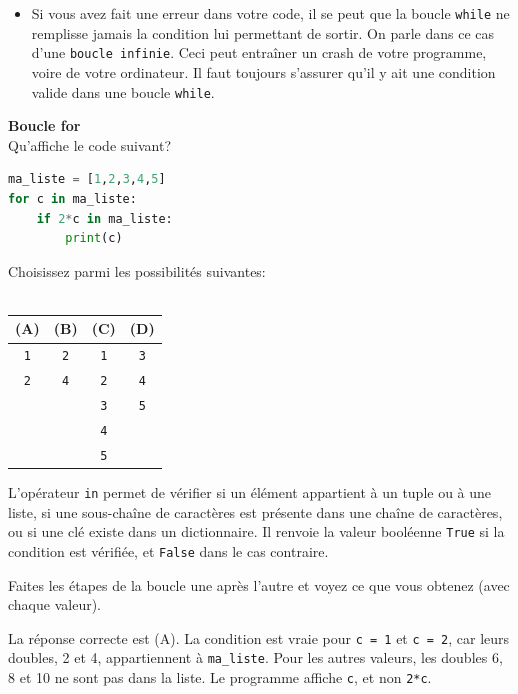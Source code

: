 \begin{itemize}
     	\item Si vous avez fait une erreur dans votre code, il se peut que la boucle \lstinline{while} ne remplisse jamais la condition lui permettant de sortir. On parle dans ce cas d'une \lstinline{boucle infinie}. Ceci peut entraîner un crash de votre programme, voire de votre ordinateur. Il faut toujours s'assurer qu'il y ait une condition valide dans une boucle \lstinline{while}. \\
     	
     	\end{itemize}
     	
     	
    \begin{Exercice}[5 minutes] [Python] \textbf{Boucle for}\\
      	Qu'affiche le code suivant?
      	
      	\begin{lstlisting}[language=Python]
ma_liste = [1,2,3,4,5]
for c in ma_liste:
    if 2*c in ma_liste:
        print(c) 
             	\end{lstlisting}
             	
        Choisissez parmi les possibilités suivantes: \\ \\
        \begin{tabular}{|c|c|c|c|}
\hline
(A) & (B) & (C) & (D)  \\
\hline
\texttt{1} & \texttt{2} & \texttt{1} & \texttt{3} \\
\texttt{2} & \texttt{4} & \texttt{2} & \texttt{4} \\
 &  & \texttt{3} & \texttt{5} \\
 &  & \texttt{4} &  \\
 &  & \texttt{5} &  \\
\hline
\end{tabular}

\begin{conseil}
    L'opérateur \lstinline{in} permet de vérifier si un élément appartient à un tuple ou à une liste, si une sous-chaîne de caractères est présente dans une chaîne de caractères, ou si une clé existe dans un dictionnaire. Il renvoie la valeur booléenne \lstinline{True} si la condition est vérifiée, et \lstinline{False} dans le cas contraire.
\end{conseil}
    
        \begin{conseil}
		   Faites les étapes de la boucle une après l'autre et voyez ce que vous obtenez (avec chaque valeur).  
        \end{conseil}
        
        \begin{solution}
            La réponse correcte est (A).
            La condition est vraie pour \texttt{c = 1} et \texttt{c = 2}, car leurs doubles, 2 et 4, appartiennent à \texttt{ma\_liste}. Pour les autres valeurs, les doubles 6, 8 et 10 ne sont pas dans la liste. Le programme affiche \texttt{c}, et non \texttt{2*c}.
        \end{solution}
    \end{Exercice}
    

